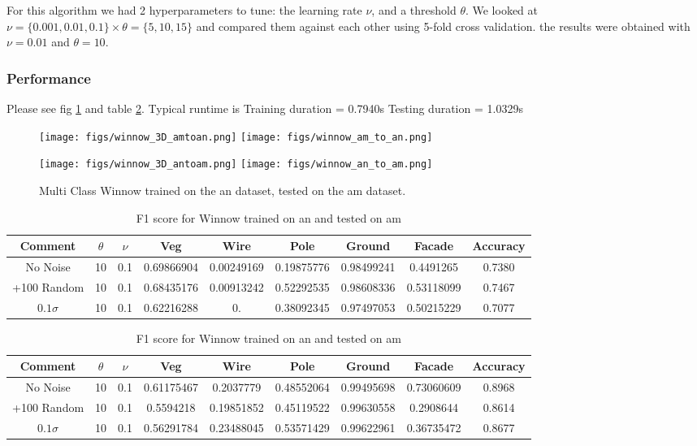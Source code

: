 \documentclass[10pt,a4paper]{article}
\begin{document}
For this algorithm we had 2 hyperparameters to tune: the learning rate $\nu$, and a threshold $\theta$. We looked at $\nu = \{0.001,0.01,0.1\} \times \theta = \{5,10,15\}$ and compared them against each other using 5-fold cross validation. the results were obtained with $\nu = 0.01$ and $\theta = 10$.

\subsubsection{Performance}
Please see fig \ref{winnow_perf} and table \ref{winnow_tab}. Typical runtime is 
Training duration =  0.7940s
Testing duration =  1.0329s
\begin{figure}[h]
\centering
\texttt{[image: figs/winnow\_3D\_amtoan.png]}
\texttt{[image: figs/winnow\_am\_to\_an.png]}
\caption{Multi Class Winnow trained on the am dataset, tested on the an dataset. The confusion matrix has been scaled column-wise to enhance visibility.}
\vspace{10pt}
\texttt{[image: figs/winnow\_3D\_antoam.png]}
\texttt{[image: figs/winnow\_an\_to\_am.png]}
\caption{Multi Class Winnow trained on the an dataset, tested on the am dataset. }
\label{winnow_perf}
\end{figure}

\begin{table}[h]
\centering
\begin{tabular}{||c|c|c||c|c|c|c|c||c||}
\hline
Comment&$\theta$&$\nu$&Veg & Wire & Pole & Ground & Facade & Accuracy\\ \hline
No Noise&10 & 0.1 &  0.69866904 & 0.00249169  &0.19875776 & 0.98499241 & 0.4491265&0.7380\\ \hline
+100 Random&10 & 0.1 &  0.68435176 & 0.00913242&  0.52292535 & 0.98608336 & 0.53118099 &0.7467\\ \hline
$0.1 \sigma$&10 & 0.1 & 0.62216288 & 0.   &       0.38092345  &0.97497053 & 0.50215229 & 0.7077\\ \hline
\end{tabular}
\caption{F1 score for Winnow trained on am and tested on an}
\vspace{10pt}
\begin{tabular}{||c|c|c||c|c|c|c|c||c||}
\hline
Comment&$\theta$&$\nu$&Veg & Wire & Pole & Ground & Facade & Accuracy\\ \hline
No Noise&10 & 0.1 &  0.61175467&  0.2037779  & 0.48552064  &0.99495698 & 0.73060609&0.8968\\ \hline
+100 Random&10 & 0.1 &  0.5594218   &0.19851852 & 0.45119522 & 0.99630558 & 0.2908644 & 0.8614\\ \hline
$0.1 \sigma$&10 & 0.1 & 0.56291784 & 0.23488045  &0.53571429 & 0.99622961 & 0.36735472 & 0.8677\\ \hline
\end{tabular}
\caption{F1 score for Winnow trained on an and tested on am}
\label{winnow_tab}
\end{table}
\end{document}

